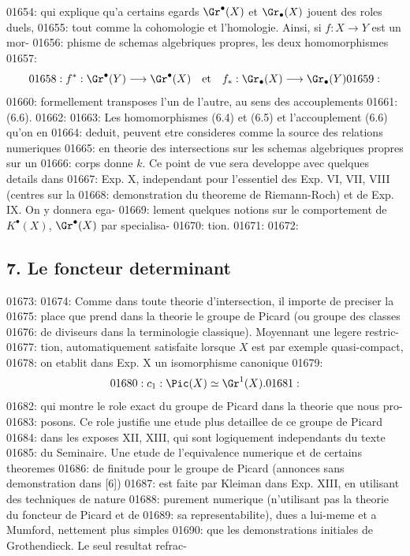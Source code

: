 01654: qui explique qu'a certains egards $\Gr^{\bullet}(X)$ et $\Gr_{\bullet}(X)$ jouent des roles duels,
01655: tout comme la cohomologie et l'homologie. Ainsi, si $f: X \to Y$ est un mor-
01656: phisme de schemas algebriques propres, les deux homomorphismes
01657: \[
01658: f^{*}: \Gr^{\bullet}(Y) \longrightarrow \Gr^{\bullet}(X) \quad \text{et} \quad f_{*}: \Gr_{\bullet}(X) \longrightarrow \Gr_{\bullet}(Y)
01659: \]
01660: formellement transposes l'un de l'autre, au sens des accouplements
01661: (6.6).
01662: 
01663: Les homomorphismes (6.4) et (6.5) et l'accouplement (6.6) qu'on en
01664: deduit, peuvent etre consideres comme la source des relations numeriques
01665: en theorie des intersections sur les schemas algebriques propres sur un
01666: corps donne $k$. Ce point de vue sera developpe avec quelques details dans
01667: Exp. X, independant pour l'essentiel des Exp. VI, VII, VIII (centres sur la
01668: demonstration du theoreme de Riemann-Roch) et de Exp. IX. On y donnera ega-
01669: lement quelques notions sur le comportement de $K^{\bullet}(X)$, $\Gr^{\bullet}(X)$ par specialisa-
01670: tion.
01671: 
01672: \subsection*{7. Le foncteur determinant}
01673: 
01674: Comme dans toute theorie d'intersection, il importe de preciser la
01675: place que prend dans la theorie le groupe de Picard (ou groupe des classes
01676: de diviseurs dans la terminologie classique). Moyennant une legere restric-
01677: tion, automatiquement satisfaite lorsque $X$ est par exemple quasi-compact,
01678: on etablit dans Exp. X un isomorphisme canonique
01679: \begin{equation}
01680: c_1: \Pic(X) \simeq \Gr^1(X).
01681: \end{equation}
01682: qui montre le role exact du groupe de Picard dans la theorie que nous pro-
01683: posons. Ce role justifie une etude plus detaillee de ce groupe de Picard
01684: dans les exposes XII, XIII, qui sont logiquement independants du texte
01685: du Seminaire. Une etude de l'equivalence numerique et de certains theoremes
01686: de finitude pour le groupe de Picard (annonces sans demonstration dans [6])
01687: est faite par Kleiman dans Exp. XIII, en utilisant des techniques de nature
01688: purement numerique (n'utilisant pas la theorie du foncteur de Picard et de
01689: sa representabilite), dues a lui-meme et a Mumford, nettement plus simples
01690: que les demonstrations initiales de Grothendieck. Le seul resultat refrac-
